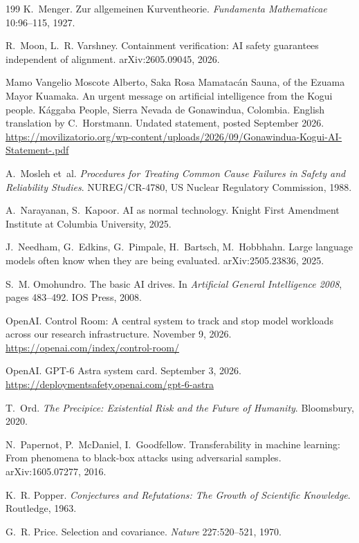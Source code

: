 \documentclass[10pt,twocolumn,letterpaper]{article}
\theoremstyle{definition}
\begin{document}
\begin{thebibliography}{199}
 K.~Menger. Zur allgemeinen Kurventheorie. \emph{Fundamenta Mathematicae} 10:96--115, 1927.

 R.~Moon, L.~R. Varshney. Containment verification: AI safety guarantees independent of alignment. arXiv:2605.09045, 2026.

 Mamo Vangelio Moscote Alberto, Saka Rosa Mamatac\'an Sauna, of the Ezuama Mayor Kuamaka. An urgent message on artificial intelligence from the Kogui people. K\'aggaba People, Sierra Nevada de Gonawindua, Colombia. English translation by C.~Horstmann. Undated statement, posted September 2026. \url{https://movilizatorio.org/wp-content/uploads/2026/09/Gonawindua-Kogui-AI-Statement-.pdf}

 A.~Mosleh et~al. \emph{Procedures for Treating Common Cause Failures in Safety and Reliability Studies}. NUREG/CR-4780, US Nuclear Regulatory Commission, 1988.

 A.~Narayanan, S.~Kapoor. AI as normal technology. Knight First Amendment Institute at Columbia University, 2025.

 J.~Needham, G.~Edkins, G.~Pimpale, H.~Bartsch, M.~Hobbhahn. Large language models often know when they are being evaluated. arXiv:2505.23836, 2025.

 S.~M. Omohundro. The basic AI drives. In \emph{Artificial General Intelligence 2008}, pages 483--492. IOS Press, 2008.

 OpenAI. Control Room: A central system to track and stop model workloads across our research infrastructure. November 9, 2026. \url{https://openai.com/index/control-room/}

 OpenAI. GPT-6 Astra system card. September 3, 2026. \url{https://deploymentsafety.openai.com/gpt-6-astra}

 T.~Ord. \emph{The Precipice: Existential Risk and the Future of Humanity}. Bloomsbury, 2020.

 N.~Papernot, P.~McDaniel, I.~Goodfellow. Transferability in machine learning: From phenomena to black-box attacks using adversarial samples. arXiv:1605.07277, 2016.

 K.~R. Popper. \emph{Conjectures and Refutations: The Growth of Scientific Knowledge}. Routledge, 1963.

 G.~R. Price. Selection and covariance. \emph{Nature} 227:520--521, 1970.


\end{thebibliography}
\end{document}
